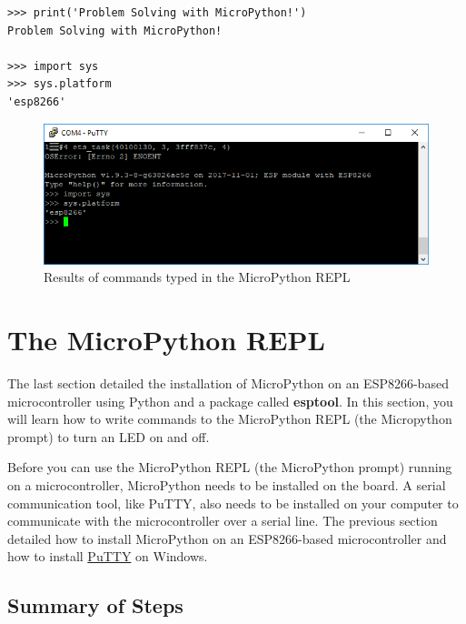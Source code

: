 \documentclass{book}
\makeatletter
\def\maxwidth{\ifdim\Gin@nat@width>\linewidth\linewidth
    \else\Gin@nat@width\fi}
\let\Oldincludegraphics\includegraphics
\renewcommand{\includegraphics}[1]{\Oldincludegraphics[width=.8\maxwidth]{#1}}
\makeatother
\begin{document}
\begin{lstlisting}
>>> print('Problem Solving with MicroPython!')
Problem Solving with MicroPython!

>>> import sys
>>> sys.platform
'esp8266'
\end{lstlisting}

\begin{figure}
\centering
\includegraphics{images/sys_dot_platform.PNG}
\caption{Results of commands typed in the MicroPython REPL}
\end{figure}
    




    
        \section{The MicroPython REPL}\label{the-micropython-repl}
    




    
        The last section detailed the installation of MicroPython on an
ESP8266-based microcontroller using Python and a package called
\textbf{esptool}. In this section, you will learn how to write commands
to the MicroPython REPL (the Micropython prompt) to turn an LED on and
off.

Before you can use the MicroPython REPL (the MicroPython prompt) running
on a microcontroller, MicroPython needs to be installed on the board. A
serial communication tool, like PuTTY, also needs to be installed on
your computer to communicate with the microcontroller over a serial
line. The previous section detailed how to install MicroPython on an
ESP8266-based microcontroller and how to install
\href{https://www.putty.org/}{PuTTY} on Windows.
    




    
        \subsection{Summary of Steps}\label{summary-of-steps}
    
\end{document}
